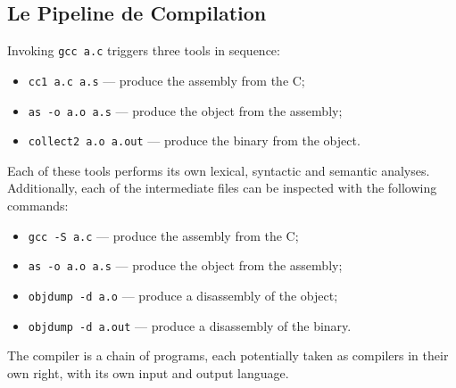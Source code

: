 \subsection{Le Pipeline de Compilation}
\begin{example}
  Invoking \texttt{gcc a.c} triggers three tools in sequence:
  \begin{itemize}
    \item \verb|cc1 a.c a.s| --- produce the assembly from the C;
    \item \verb|as -o a.o a.s| --- produce the object from the assembly;
    \item \verb|collect2 a.o a.out| --- produce the binary from the object.
  \end{itemize}
  Each of these tools performs its own lexical, syntactic and semantic
  analyses. Additionally, each of the intermediate files can be inspected with
  the following commands:
  \begin{itemize}
    \item \texttt{gcc -S a.c} --- produce the assembly from the C;
    \item \texttt{as -o a.o a.s} --- produce the object from the assembly;
    \item \texttt{objdump -d a.o} --- produce a disassembly of the object;
    \item \texttt{objdump -d a.out} --- produce a disassembly of the binary.
  \end{itemize}
\end{example}

The compiler is a chain of programs, each potentially taken as compilers in
their own right, with its own input and output language.
